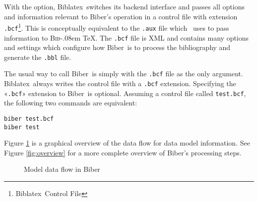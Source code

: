 \documentclass{ltxdockit}
\def\BibTeX{\textsc{Bib}\kern-.08em \TeX}
\newcommand*{\biber}{Biber\xspace}
\newcommand*{\biblatex}{Biblatex\xspace}
\begin{document}
With the  option, \biblatex\ switches its backend
interface and passes all options and information relevant to \biber's
operation in a control file with extension \verb+.bcf+\footnote{\biblatex\ Control
  File}. This is conceptually equivalent to the \verb+.aux+ file which
\latex\ uses to pass information to \BibTeX. The \verb+.bcf+ file is
XML and contains many options and settings which configure how \biber\
is to process the bibliography and generate the \verb+.bbl+ file.

The usual way to call \biber\ is simply with the \verb+.bcf+ file
as the only argument. \biblatex\ always writes the control file with
a \verb+.bcf+ extension. Specifying the «\verb+.bcf+» extension to
\biber\ is optional. Assuming a control file called
\verb+test.bcf+, the following two commands are equivalent:

\begin{verbatim}
biber test.bcf
biber test
\end{verbatim}

\noindent Figure \ref{fig:biber-mdf} is a graphical overview of the data flow for
data model information. See Figure \ref{fig:overview} for a more complete
overview of \biber's processing steps.

\begin{figure}[!htpb]
  \centering\small
  \caption{Model data flow in \biber}
  \label{fig:biber-mdf}
\end{figure}
\bigskip
\end{document}
